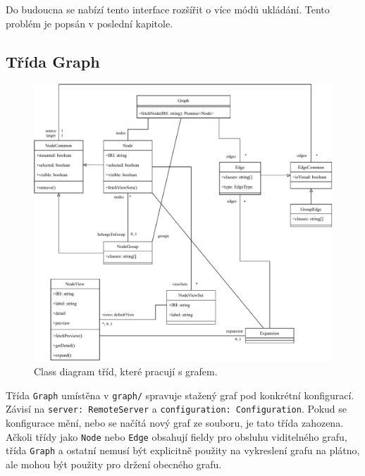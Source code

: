 \smallskip

Do budoucna se nabízí tento interface rozšířit o více módů ukládání. Tento problém je popsán v poslední kapitole.

\subsection{Třída Graph}

\begin{figure}
    \centering
    \includegraphics[width=\textwidth]{media/graph.pdf}
    \caption{Class diagram tříd, které pracují s grafem.}
\end{figure}

Třída \texttt{Graph} umístěna v \texttt{graph/} spravuje stažený graf pod konkrétní konfigurací. Závisí na \texttt{server: RemoteServer} a \texttt{configuration: Configuration}. Pokud se konfigurace mění, nebo se načítá nový graf ze souboru, je tato třída zahozena. Ačkoli třídy jako \texttt{Node} nebo \texttt{Edge} obsahují fieldy pro obsluhu viditelného grafu, třída \texttt{Graph} a ostatní nemusí být explicitně použity na vykreslení grafu na plátno, ale mohou být použity pro držení obecného grafu.

